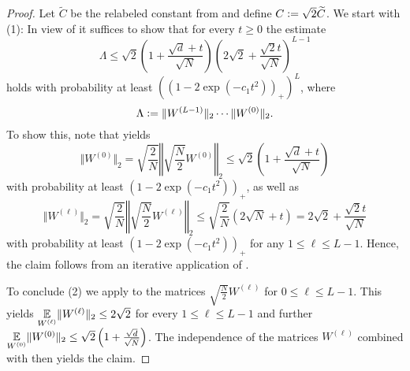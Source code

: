 \begin{proof}
Let $\widetilde{C}$ be the relabeled constant from  and define $C \mathrel{\mathop:}= \sqrt{2} \widetilde{C}$. We start with (1): In view of  it suffices to show that for every $t \geq 0$ the estimate
\begin{equation*}
\Lambda \leq \sqrt{2}\left(1 + \frac{\sqrt{d} + t}{\sqrt{N}}\right)\left(2\sqrt{2} + \frac{\sqrt{2}t}{\sqrt{N}}\right)^{L-1}
\end{equation*}
holds with probability at least $\left((1-2\exp(-c_1 t^2))_+\right)^L$, where
\begin{equation*}
\Lambda \mathrel{\mathop:}= \Vert W^{(L-1)}\Vert_2 \cdots \Vert W^{(0)} \Vert_2.
\end{equation*}
To show this, note that \cite[Corollary 7.3.3]{vershynin_high-dimensional_2018} yields
\begin{equation*}
\Vert W^{(0)} \Vert_2 = \sqrt{\frac{2}{N}} \left\Vert \sqrt{\frac{N}{2}} W^{(0)}\right\Vert_2\leq \sqrt{2} \left(1 + \frac{\sqrt{d} + t}{\sqrt{N}}\right)
\end{equation*}
with probability at least $(1- 2\exp(-c_1 t^2))_+$, as well as
\begin{equation*}
\Vert W^{(\ell)} \Vert_2 = \sqrt{\frac{2}{N}} \left\Vert \sqrt{\frac{N}{2}} W^{(\ell)} \right\Vert_2 \leq \sqrt{\frac{2}{N}} (2 \sqrt{N} + t)= 2\sqrt{2} + \frac{\sqrt{2}t}{\sqrt{N}}
\end{equation*}
with probability at least $(1- 2\exp(-c_1 t^2))_+$ for any $1 \leq \ell \leq L-1$. Hence, the claim follows from an iterative application of .

To conclude (2) we apply \cite[Theorem 7.3.1]{vershynin_high-dimensional_2018} to the matrices $\sqrt{\frac{N}{2}} W^{(\ell)}$ for $0 \leq \ell \leq L-1$. This yields $\underset{W^{(\ell)}}{\mathbb{E}} \Vert W^{(\ell)} \Vert_2 \leq 2 \sqrt{2}$ for every $1 \leq \ell \leq L-1$ and further $\underset{W^{(0)}}{\mathbb{E}} \Vert W^{(0)}\Vert_2\leq \sqrt{2} \left(1 + \frac{\sqrt{d}}{\sqrt{N}} \right)$. The independence of the matrices $W^{(\ell)}$ combined with  then yields the claim.
\end{proof}

